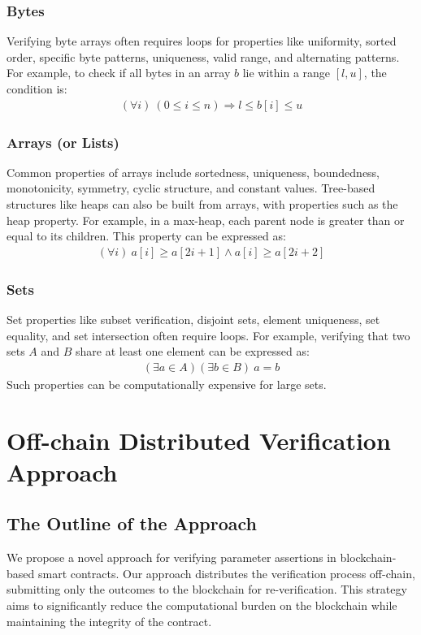 \documentclass[runningheads]{llncs}
\begin{document}
\subsubsection{Bytes}
Verifying byte arrays often requires loops for properties like uniformity, sorted order, specific byte patterns, uniqueness, valid range, and alternating patterns. For example, to check if all bytes in an array \(b\) lie within a range \([l, u]\), the condition is:
\begin{gather*}
(\forall i) \ (0 \leq i \leq n) \Rightarrow l \leq b[i] \leq u
\end{gather*}
\subsubsection{Arrays (or Lists)}
Common properties of arrays include sortedness, uniqueness, boundedness, monotonicity, symmetry, cyclic structure, and constant values. %
Tree-based structures like heaps can also be built from arrays, with properties such as the heap property. For example, in a max-heap, each parent node is greater than or equal to its children. This property can be expressed as:
\begin{gather*}
(\forall i) \ a[i] \geq a[2i+1] \land a[i] \geq a[2i+2]
\end{gather*}
\subsubsection{Sets}
Set properties like subset verification, disjoint sets, element uniqueness, set equality, and set intersection often require loops. For example, verifying that two sets \(A\) and \(B\) share at least one element can be expressed as:
\begin{gather*}
(\exists a \in A) (\exists b \in B)\ a = b
\end{gather*}
Such properties can be computationally expensive for large sets.
\section{Off-chain Distributed Verification Approach}
\label{sec:offchain-distributed-verification-approach}
\subsection{The Outline of the Approach}
We propose a novel approach for verifying parameter assertions in blockchain-based smart contracts. Our approach distributes the verification process off-chain, submitting only the outcomes to the blockchain for re-verification. This strategy aims to significantly reduce the computational burden on the blockchain while maintaining the integrity of the contract.
\end{document}
